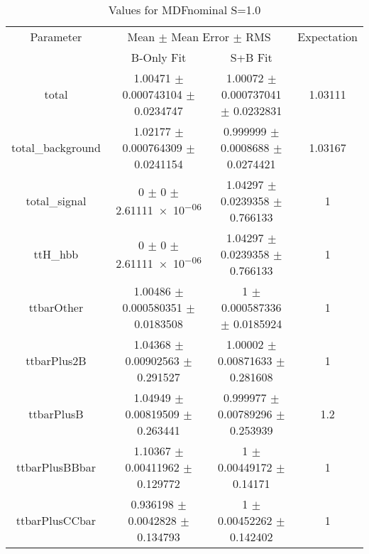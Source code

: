 \begin{table}
\centering
\caption{Values for MDFnominal S=1.0}
\begin{tabular}{cccc}
\toprule
Parameter & \multicolumn{2}{c}{Mean $\pm$ Mean Error $\pm$ RMS} & Expectation\\
 & B-Only Fit & S+B Fit & \\
\midrule
total & \num{1.00471} $\pm$ \num{0.000743104} $\pm$ \num{0.0234747} & \num{1.00072} $\pm$ \num{0.000737041} $\pm$ \num{0.0232831} & \num{1.03111}\\
total\_background & \num{1.02177} $\pm$ \num{0.000764309} $\pm$ \num{0.0241154} & \num{0.999999} $\pm$ \num{0.0008688} $\pm$ \num{0.0274421} & \num{1.03167}\\
total\_signal & \num{0} $\pm$ \num{0} $\pm$ \num{2.61111e-06} & \num{1.04297} $\pm$ \num{0.0239358} $\pm$ \num{0.766133} & \num{1}\\
ttH\_hbb & \num{0} $\pm$ \num{0} $\pm$ \num{2.61111e-06} & \num{1.04297} $\pm$ \num{0.0239358} $\pm$ \num{0.766133} & \num{1}\\
ttbarOther & \num{1.00486} $\pm$ \num{0.000580351} $\pm$ \num{0.0183508} & \num{1} $\pm$ \num{0.000587336} $\pm$ \num{0.0185924} & \num{1}\\
ttbarPlus2B & \num{1.04368} $\pm$ \num{0.00902563} $\pm$ \num{0.291527} & \num{1.00002} $\pm$ \num{0.00871633} $\pm$ \num{0.281608} & \num{1}\\
ttbarPlusB & \num{1.04949} $\pm$ \num{0.00819509} $\pm$ \num{0.263441} & \num{0.999977} $\pm$ \num{0.00789296} $\pm$ \num{0.253939} & \num{1.2}\\
ttbarPlusBBbar & \num{1.10367} $\pm$ \num{0.00411962} $\pm$ \num{0.129772} & \num{1} $\pm$ \num{0.00449172} $\pm$ \num{0.14171} & \num{1}\\
ttbarPlusCCbar & \num{0.936198} $\pm$ \num{0.0042828} $\pm$ \num{0.134793} & \num{1} $\pm$ \num{0.00452262} $\pm$ \num{0.142402} & \num{1}\\
\bottomrule
\end{tabular}
\end{table}